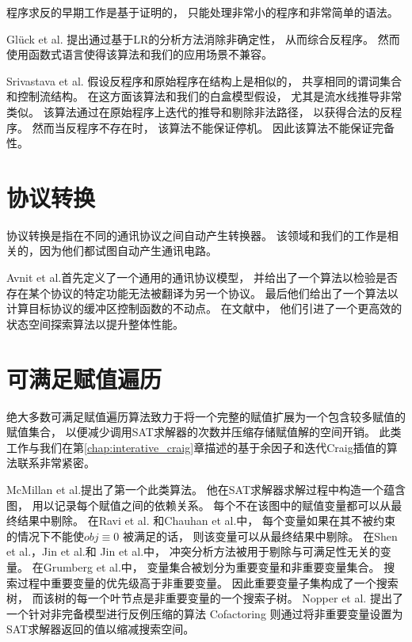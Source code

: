 程序求反的早期工作是基于证明的，
只能处理非常小的程序和非常简单的语法。

Gl\"{u}ck et al.  提出通过基于LR的分析方法消除非确定性，
从而综合反程序。
然而使用函数式语言使得该算法和我们的应用场景不兼容。

Srivastava et al. 假设反程序和原始程序在结构上是相似的，
共享相同的谓词集合和控制流结构。
在这方面该算法和我们的白盒模型假设，
尤其是流水线推导非常类似。
该算法通过在原始程序上迭代的推导和剔除非法路径，
以获得合法的反程序。
然而当反程序不存在时，
该算法不能保证停机。
因此该算法不能保证完备性。



\section{协议转换}
协议转换是指在不同的通讯协议之间自动产生转换器。
该领域和我们的工作是相关的，因为他们都试图自动产生通讯电路。

Avnit et al.首先定义了一个通用的通讯协议模型，
并给出了一个算法以检验是否存在某个协议的特定功能无法被翻译为另一个协议。
最后他们给出了一个算法以计算目标协议的缓冲区控制函数的不动点。
在文献中，
他们引进了一个更高效的状态空间探索算法以提升整体性能。

\section{可满足赋值遍历}\label{subsec_relallsat}

绝大多数可满足赋值遍历算法致力于将一个完整的赋值扩展为一个包含较多赋值的赋值集合，
以便减少调用SAT求解器的次数并压缩存储赋值解的空间开销。
此类工作与我们在第\ref{chap:interative_craig}章描述的基于余因子和迭代Craig插值的算法联系非常紧密。

McMillan et al.提出了第一个此类算法。
他在SAT求解器求解过程中构造一个蕴含图，
用以记录每个赋值之间的依赖关系。
每个不在该图中的赋值变量都可以从最终结果中剔除。
在Ravi et al. 和Chauhan et al.中，
每个变量如果在其不被约束的情况下不能使$obj\equiv 0$ 被满足的话，
则该变量可以从最终结果中剔除。
在Shen et al.，Jin et al.和 Jin et al.中，
冲突分析方法被用于剔除与可满足性无关的变量。
在Grumberg et al.中，
变量集合被划分为重要变量和非重要变量集合。
搜索过程中重要变量的优先级高于非重要变量。
因此重要变量子集构成了一个搜索树，
而该树的每一个叶节点是非重要变量的一个搜索子树。
Nopper et al. 提出了一个针对非完备模型进行反例压缩的算法
Cofactoring  则通过将非重要变量设置为SAT求解器返回的值以缩减搜索空间。

